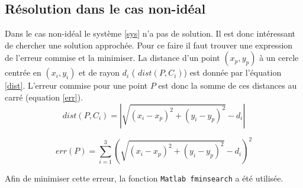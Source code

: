 \documentclass[10pt,a4paper]{article}
\begin{document}
		\subsection{Résolution dans le cas non-idéal}
			Dans le cas non-idéal le système \ref{sys} n'a pas de solution. Il est donc intéressant de chercher une solution approchée. Pour ce faire il faut trouver une expression de l'erreur commise et la minimiser. La distance d'un point $(x_p , y_p)$ à un cercle centrée en $(x_i , y_i)$ et de rayon $d_i$ ( $dist(P , C_i)$) est donnée par l'équation \ref{dist}. L'erreur commise pour une point $P$ est donc la somme de ces distances au carré (equation \ref{err}). 
			\begin{equation}
				dist(P , C_i)= |{\sqrt{(x_i-x_p)^2 +(y_i - y_p)^2} - d_i}| 
				\label{dist}
			\end{equation} 
			
			\begin{equation}
				\label{err}
				err(P) = \sum _{i=1} ^{3} (\sqrt{(x_i-x_p)^2 +(y_i - y_p)^2} - d_i)^2
			\end{equation}
			
			Afin de minimiser cette erreur, la fonction \texttt{Matlab fminsearch} a été utilisée. 
				
	
\end{document}
